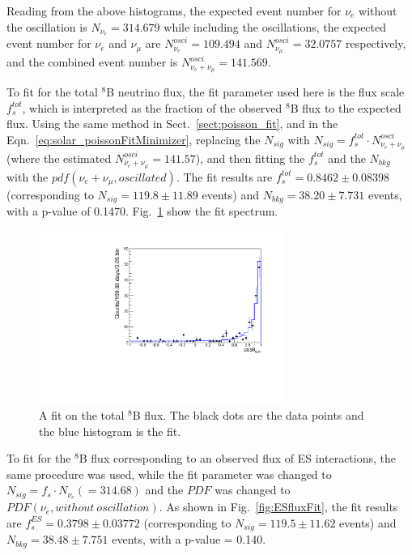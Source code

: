 Reading from the above histograms, the expected event number for $\nu_e$ without the oscillation is $N_{\nu_e} = 314.679$ while including the oscillations, the expected event number for $\nu_e$ and $\nu_\mu$ are $N^{osci}_{\nu_e} = 109.494$ and $N^{osci}_{\nu_\mu} = 32.0757$ respectively, and the combined event number is $N^{osci}_{\nu_e+\nu_\mu}=141.569$.

To fit for the total $^8$B neutrino flux, the fit parameter used here is the flux scale $f^{tot}_s$, which is interpreted as the fraction of the observed $^8$B flux to the expected flux. Using the same method in Sect.~\ref{sect:poisson_fit}, and in the Eqn.~\ref{eq:solar_poissonFitMinimizer}, replacing the $N_{sig}$ with $N_{sig}=f^{tot}_s\cdot N^{osci}_{\nu_e+\nu_\mu}$(where the estimated $N^{osci}_{\nu_e+\nu_\mu}=141.57$), and then fitting the $f^{tot}_s$ and the $N_{bkg}$ with the $pdf(\nu_e+\nu_\mu,oscillated)$. The fit results are $f^{tot}_s=0.8462\pm 0.08398$ (corresponding to $N_{sig}=119.8\pm11.89$ events) and $N_{bkg}=38.20\pm7.731$ events, with a p-value of 0.1470. Fig.~\ref{fig:TOTALfluxFit} show the fit spectrum.

\begin{figure}[!htb]
	\centering
	\includegraphics[width=8cm]{TotalFluxFit.pdf}
	\caption[A fit on the total $^8$B flux.]{A fit on the total $^8$B flux. The black dots are the data points and the blue histogram is the fit.}
	\label{fig:TOTALfluxFit}
\end{figure}

To fit for the $^8$B flux corresponding to an observed flux of ES interactions, the same procedure was used, while the fit parameter was changed to $N_{sig}=f_s\cdot N_{\nu_e}(=314.68)$ and the $PDF$ was changed to $PDF(\nu_e,without~oscillation)$. As shown in Fig.~\ref{fig:ESfluxFit}, the fit results are $f^{ES}_s=0.3798\pm 0.03772$ (corresponding to $N_{sig}=119.5\pm11.62$ events) and $N_{bkg}=38.48\pm 7.751$ events, with a p-value = 0.140.

